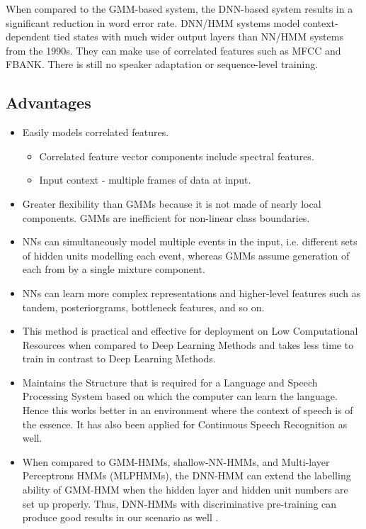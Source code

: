 When compared to the GMM-based system, the DNN-based system results in a significant reduction in word error rate. DNN/HMM systems model context-dependent tied states with much wider output layers than NN/HMM systems from the 1990s. They can make use of correlated features such as MFCC and FBANK. There is still no speaker adaptation or sequence-level training.

\subsection{Advantages}
\label{sub:hybrid-asr-advantage}

\begin{itemize}
    \item Easily models correlated features. 
    \begin{itemize}
        \item Correlated feature vector components include spectral features.
        \item Input context - multiple frames of data at input.
    \end{itemize}
    \item Greater flexibility than GMMs because it is not made of nearly local components. GMMs are inefficient for non-linear class boundaries.
    \item NNs can simultaneously model multiple events in the input, i.e. different sets of hidden units modelling each event, whereas GMMs assume generation of each from by a single mixture component.
    \item NNs can learn more complex representations and higher-level features such as tandem, posteriorgrams, bottleneck features, and so on.
    \item This method is practical and effective for deployment on Low Computational Resources when compared to Deep Learning Methods and takes less time to train in contrast to Deep Learning Methods.
    \item Maintains the Structure that is required for a Language and Speech Processing System based on which the computer can learn the language. \cite{kincaid_state_2018} Hence this works better in an environment where the context of speech is of the essence. It has also been applied for Continuous Speech Recognition as well. \cite{morgan_continuous_1995} 
    \item When compared to GMM-HMMs, shallow-NN-HMMs, and Multi-layer Perceptrons HMMs (MLPHMMs), the DNN-HMM can extend the labelling ability of GMM-HMM when the hidden layer and hidden unit numbers are set up properly. Thus, DNN-HMMs with discriminative pre-training can produce good results in our scenario as well \cite{li_hybrid_2013}.
\end{itemize}


